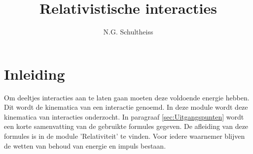 
\usepackage{multicol}



\title{Relativistische interacties}
\author{N.G. Schultheiss}

\maketitle
\thispagestyle{firststyle}

\section{Inleiding}

Om deeltjes interacties aan te laten gaan moeten deze 
voldoende energie hebben. Dit wordt de kinematica van een interactie 
genoemd. In deze module wordt deze kinematica van interacties onderzocht. 
In paragraaf \ref{sec:Uitgangspunten} wordt een korte samenvatting
van de gebruikte formules gegeven. De afleiding van deze formules is in de 
module 'Relativiteit' te vinden. Voor iedere waarnemer blijven de wetten van 
behoud van energie en impuls bestaan.

